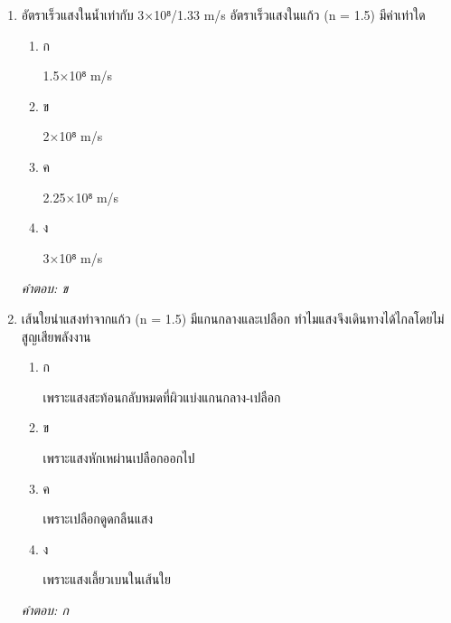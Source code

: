 \documentclass[12pt]{article}
\begin{document}
\begin{enumerate}[label=\arabic*., itemsep=0.5\baselineskip, topsep=0.5\baselineskip, leftmargin=*]
\item อัตราเร็วแสงในน้ำเท่ากับ 3×10⁸/1.33 m/s อัตราเร็วแสงในแก้ว (n = 1.5) มีค่าเท่าใด
\begin{enumerate}[label=\alph*)., itemsep=0.3\baselineskip, topsep=0.3\baselineskip]
\item ก\ 
\begin{minipage}[t]{0.9\linewidth}
\raggedright 1.5×10⁸ m/s
\end{minipage}
\item ข\ 
\begin{minipage}[t]{0.9\linewidth}
\raggedright 2×10⁸ m/s
\end{minipage}
\item ค\ 
\begin{minipage}[t]{0.9\linewidth}
\raggedright 2.25×10⁸ m/s
\end{minipage}
\item ง\ 
\begin{minipage}[t]{0.9\linewidth}
\raggedright 3×10⁸ m/s
\end{minipage}
\end{enumerate}
\vspace{-0.3\baselineskip}
\begin{small}
\textit{คำตอบ: ข}
\end{small}

\item เส้นใยนำแสงทำจากแก้ว (n = 1.5) มีแกนกลางและเปลือก ทำไมแสงจึงเดินทางได้ไกลโดยไม่สูญเสียพลังงาน
\begin{enumerate}[label=\alph*)., itemsep=0.3\baselineskip, topsep=0.3\baselineskip]
\item ก\ 
\begin{minipage}[t]{0.9\linewidth}
\raggedright เพราะแสงสะท้อนกลับหมดที่ผิวแบ่งแกนกลาง-เปลือก
\end{minipage}
\item ข\ 
\begin{minipage}[t]{0.9\linewidth}
\raggedright เพราะแสงหักเหผ่านเปลือกออกไป
\end{minipage}
\item ค\ 
\begin{minipage}[t]{0.9\linewidth}
\raggedright เพราะเปลือกดูดกลืนแสง
\end{minipage}
\item ง\ 
\begin{minipage}[t]{0.9\linewidth}
\raggedright เพราะแสงเลี้ยวเบนในเส้นใย
\end{minipage}
\end{enumerate}
\vspace{-0.3\baselineskip}
\begin{small}
\textit{คำตอบ: ก}
\end{small}


\end{enumerate}
\end{document}
